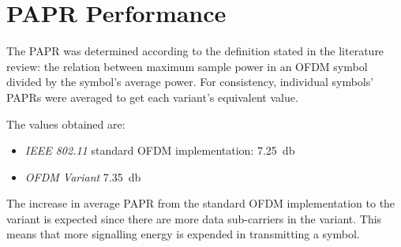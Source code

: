 \section{PAPR Performance}

The \gls{PAPR} was determined according to the definition stated in the literature review: the relation between maximum sample power in an OFDM symbol divided by the symbol's average power. For consistency, individual symbols' PAPRs were averaged to get each variant's equivalent value.

The values obtained are:
\begin{itemize}
	\item \emph{IEEE 802.11 } standard OFDM implementation: \SI{7.25}{\decibel}
	\item \emph{OFDM Variant} \SI{7.35}{\decibel}
\end{itemize}

The increase in average \gls{PAPR} from the standard OFDM implementation to the variant is expected since there are more data sub-carriers in the variant. This means that more signalling energy is expended in transmitting a symbol.